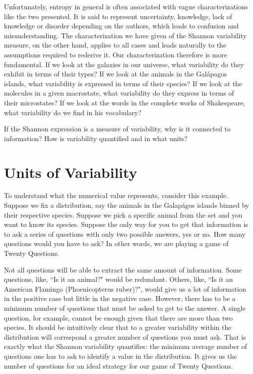 \documentclass[iopart]{revtex4-1}
\begin{document}
Unfortunately, entropy in general is often associated with vague characterizations like the two presented. It is said to represent uncertainty, knowledge, lack of knowledge or disorder depending on the authors, which leads to confusion and misunderstanding.  The characterization we have given of the Shannon variability measure, on the other hand, applies to all cases and leads naturally to the assumptions required to rederive it. Our characterization therefore is more fundamental. If we look at the galaxies in our universe, what variability do they exhibit in terms of their types? If we look at the animals in the Gal\'{a}pagos islands, what variability is expressed in terms of their species? If we look at the molecules in a given macrostate, what variability do they express in terms of their microstates? If we look at the words in the complete works of Shakespeare, what variability do we find in his vocabulary?

If the Shannon expression is a measure of variability, why is it connected to information? How is variability quantified and in what units?

\section{Units of Variability\label{uv}}

To understand what the numerical value represents, consider this example. Suppose we fix a distribution, say the animals in the Galap\'{a}gos islands binned by their respective species. Suppose we pick a specific animal from the set and you want to know its species. Suppose the only way for you to get that information is to ask a series of questions with only two possible answers, yes or no. How many questions would you have to ask? In other words, we are playing a game of Twenty Questions.

Not all questions will be able to extract the same amount of information. Some questions, like, ``Is it an animal?" would be redundant. Others, like, ``Is it an American Flamingo (Phoenicopterus ruber)?", would give us a lot of information in the positive case but little in the negative case. However, there has to be a minimum number of questions that must be asked to get to the answer. A single question, for example, cannot be enough given that there are more than two species. It should be intuitively clear that to a greater variability within the distribution will correspond a greater number of questions you must ask. That is exactly what the Shannon variability quantifies: the minimum average number of questions one has to ask to identify a value in the distribution. It gives us the number of questions for an ideal strategy for our game of Twenty Questions.
\end{document}
